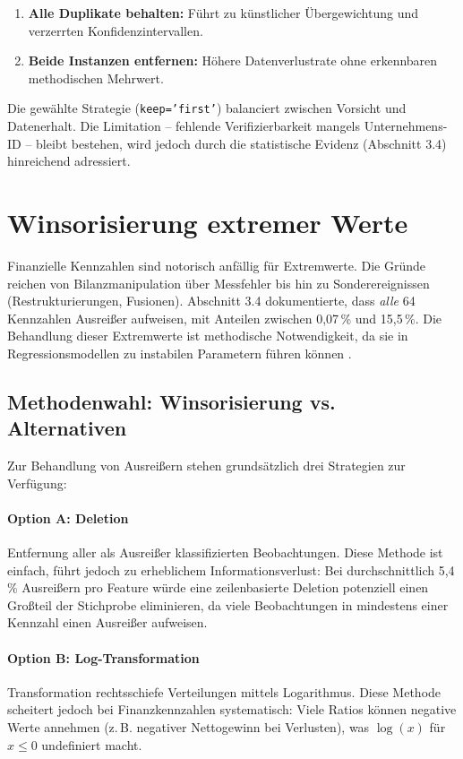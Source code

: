 \begin{enumerate}[topsep=0.2\baselineskip]
    \item \textbf{Alle Duplikate behalten:} Führt zu künstlicher Übergewichtung und verzerrten Konfidenzintervallen.
    \item \textbf{Beide Instanzen entfernen:} Höhere Datenverlustrate ohne erkennbaren methodischen Mehrwert.
\end{enumerate}

Die gewählte Strategie (\texttt{keep='first'}) balanciert zwischen Vorsicht und Datenerhalt. Die Limitation – fehlende Verifizierbarkeit mangels Unternehmens-ID – bleibt bestehen, wird jedoch durch die statistische Evidenz (Abschnitt 3.4) hinreichend adressiert.

\section{Winsorisierung extremer Werte}

Finanzielle Kennzahlen sind notorisch anfällig für Extremwerte. Die Gründe reichen von Bilanzmanipulation über Messfehler bis hin zu Sonderereignissen (Restrukturierungen, Fusionen). Abschnitt 3.4 dokumentierte, dass \textit{alle} 64 Kennzahlen Ausreißer aufweisen, mit Anteilen zwischen 0,07\,\% und 15,5\,\%. Die Behandlung dieser Extremwerte ist methodische Notwendigkeit, da sie in Regressionsmodellen zu instabilen Parametern führen können \parencite{hastieelementsstatistical2009}.

\subsection{Methodenwahl: Winsorisierung vs. Alternativen}

Zur Behandlung von Ausreißern stehen grundsätzlich drei Strategien zur Verfügung:

\paragraph{Option A: Deletion} Entfernung aller als Ausreißer klassifizierten Beobachtungen. Diese Methode ist einfach, führt jedoch zu erheblichem Informationsverlust: Bei durchschnittlich 5,4\,\% Ausreißern pro Feature würde eine zeilenbasierte Deletion potenziell einen Großteil der Stichprobe eliminieren, da viele Beobachtungen in mindestens einer Kennzahl einen Ausreißer aufweisen.

\paragraph{Option B: Log-Transformation} Transformation rechtsschiefe Verteilungen mittels Logarithmus. Diese Methode scheitert jedoch bei Finanzkennzahlen systematisch: Viele Ratios können negative Werte annehmen (z.\,B. negativer Nettogewinn bei Verlusten), was $\log(x)$ für $x \leq 0$ undefiniert macht.


